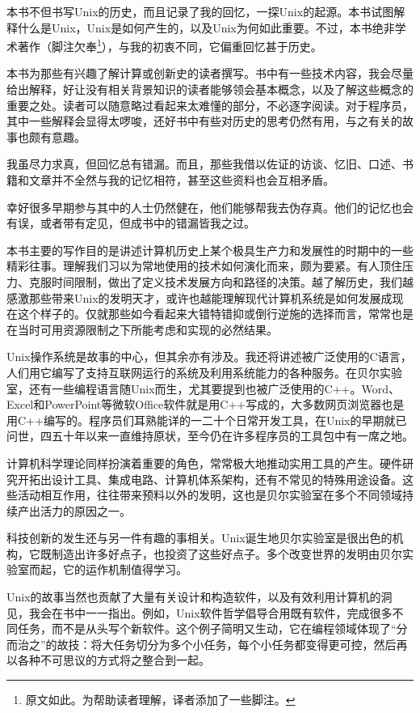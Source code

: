 \documentclass[a4paper,12pt,UTF8,twoside]{ctexbook}
\begin{document}
本书不但书写Unix的历史，而且记录了我的回忆，一探Unix的起源。本书试图解释什么是Unix，Unix是如何产生的，以及Unix为何如此重要。不过，本书绝非学术著作（脚注欠奉\footnote{原文如此。为帮助读者理解，译者添加了一些脚注。}），与我的初衷不同，它偏重回忆甚于历史。

本书为那些有兴趣了解计算或创新史的读者撰写。书中有一些技术内容，我会尽量给出解释，好让没有相关背景知识的读者能够领会基本概念，以及了解这些概念的重要之处。读者可以随意略过看起来太难懂的部分，不必逐字阅读。对于程序员，其中一些解释会显得太啰唆，还好书中有些对历史的思考仍然有用，与之有关的故事也颇有意趣。

我虽尽力求真，但回忆总有错漏。而且，那些我借以佐证的访谈、忆旧、口述、书籍和文章并不全然与我的记忆相符，甚至这些资料也会互相矛盾。

幸好很多早期参与其中的人士仍然健在，他们能够帮我去伪存真。他们的记忆也会有误，或者带有定见，但成书中的错漏皆我之过。

本书主要的写作目的是讲述计算机历史上某个极具生产力和发展性的时期中的一些精彩往事。理解我们习以为常地使用的技术如何演化而来，颇为要紧。有人顶住压力、克服时间限制，做出了定义技术发展方向和路径的决策。越了解历史，我们越感激那些带来Unix的发明天才，或许也越能理解现代计算机系统是如何发展成现在这个样子的。仅就那些如今看起来大错特错抑或倒行逆施的选择而言，常常也是在当时可用资源限制之下所能考虑和实现的必然结果。

Unix操作系统是故事的中心，但其余亦有涉及。我还将讲述被广泛使用的C语言，人们用它编写了支持互联网运行的系统及利用系统能力的各种服务。在贝尔实验室，还有一些编程语言随Unix而生，尤其要提到也被广泛使用的C++。Word、Excel和PowerPoint等微软Office软件就是用C++写成的，大多数网页浏览器也是用C++编写的。程序员们耳熟能详的一二十个日常开发工具，在Unix的早期就已问世，四五十年以来一直维持原状，至今仍在许多程序员的工具包中有一席之地。

计算机科学理论同样扮演着重要的角色，常常极大地推动实用工具的产生。硬件研究开拓出设计工具、集成电路、计算机体系架构，还有不常见的特殊用途设备。这些活动相互作用，往往带来预料以外的发明，这也是贝尔实验室在多个不同领域持续产出活力的原因之一。

科技创新的发生还与另一件有趣的事相关。Unix诞生地贝尔实验室是很出色的机构，它既制造出许多好点子，也投资了这些好点子。多个改变世界的发明由贝尔实验室而起，它的运作机制值得学习。

Unix的故事当然也贡献了大量有关设计和构造软件，以及有效利用计算机的洞见，我会在书中一一指出。例如，Unix软件哲学倡导合用既有软件，完成很多不同任务，而不是从头写个新软件。这个例子简明又生动，它在编程领域体现了“分而治之”的故技：将大任务切分为多个小任务，每个小任务都变得更可控，然后再以各种不可思议的方式将之整合到一起。
\end{document}
